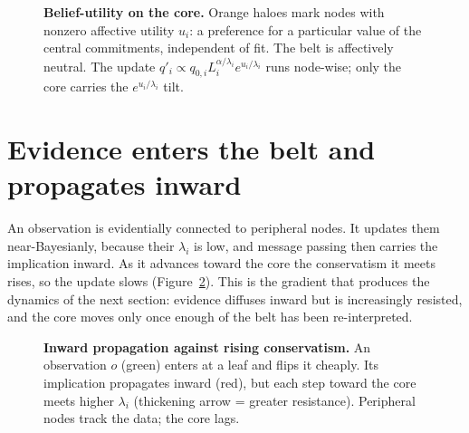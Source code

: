 \documentclass[11pt,a4paper]{article}
\newcommand{\biarrow}[2]{%
  \draw[msg] (#1) to[bend left=7] (#2);
  \draw[msg] (#2) to[bend left=7] (#1);}
\def\corelist{A/0/0, B/2.4/0, C/0/-2.4, D/2.4/-2.4}
\def\periphlist{%
  pA1/-2.1/1.0/a_1, pA2/-0.4/1.9/a_2, pA3/-2.3/-0.6/a_3,
  pB1/2.8/1.9/, pB2/4.5/1.0/, pB3/4.7/-0.5/,
  pC1/-2.3/-1.8/, pC2/-2.1/-3.4/, pC3/-0.4/-4.3/,
  pD1/2.8/-4.3/, pD2/4.5/-3.4/, pD3/4.7/-1.9/}
\def\coreedges{A/B, A/C, B/D, C/D, A/D}
\def\periphedges{A/pA1, A/pA2, A/pA3, B/pB1, B/pB2, B/pB3,
                 C/pC1, C/pC2, C/pC3, D/pD1, D/pD2, D/pD3}
\def\crossedges{pA1/pA2, pA2/pB1, pB3/pD3, pD1/pC3, pA3/pC1}
\newcommand{\beliefnetbase}[2]{%
  \foreach \n/\x/\y in \corelist {\node[#1] (\n) at (\x,\y) {$\n$};}
  \foreach \n/\x/\y/\lab in \periphlist {\node[#2] (\n) at (\x,\y) {$\lab$};}
  \begin{scope}[on background layer]
    \foreach \a/\b in \coreedges  {\biarrow{\a}{\b}}
    \foreach \a/\b in \periphedges{\biarrow{\a}{\b}}
    \foreach \a/\b in \crossedges {\biarrow{\a}{\b}}
  \end{scope}}
\begin{document}
\begin{figure}[t]
\centering
{}
\caption{\textbf{Belief-utility on the core.} Orange haloes mark nodes with
nonzero affective utility $u_i$: a preference for a particular value of the
central commitments, independent of fit. The belt is affectively neutral. The
update $q'_i\propto q_{0,i}L_i^{\alpha/\lambda_i}e^{u_i/\lambda_i}$ runs
node-wise; only the core carries the $e^{u_i/\lambda_i}$ tilt.}
\label{fig:utility}
\end{figure}

\section{Evidence enters the belt and propagates inward}

An observation is evidentially connected to peripheral nodes. It updates them
near-Bayesianly, because their $\lambda_i$ is low, and message passing then
carries the implication inward. As it advances toward the core the conservatism
it meets rises, so the update slows (Figure~\ref{fig:propagation}). This is the
gradient that produces the dynamics of the next section: evidence diffuses
inward but is increasingly resisted, and the core moves only once enough of the
belt has been re-interpreted.

\begin{figure}[t]
\centering
{}
\caption{\textbf{Inward propagation against rising conservatism.} An observation
$o$ (green) enters at a leaf and flips it cheaply. Its implication propagates
inward (red), but each step toward the core meets higher $\lambda_i$
(thickening arrow = greater resistance). Peripheral nodes track the data; the
core lags.}
\label{fig:propagation}
\end{figure}
\end{document}
